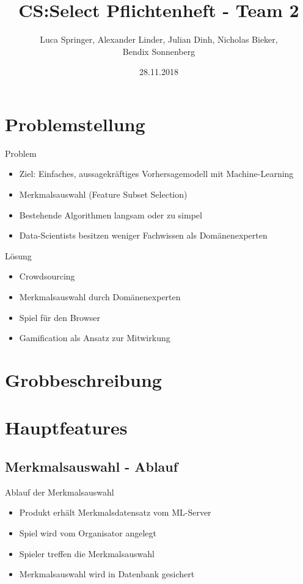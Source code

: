 \documentclass[xcolor=dvipsnames]{beamer}
\title[Team 2 - Pflichtenheft]{CS:Select Pflichtenheft - Team 2}
\author{Luca Springer, Alexander Linder, Julian Dinh, Nicholas Bieker,\\ Bendix Sonnenberg}
\date{28.11.2018}
\begin{document}
\begin{frame} %
  \titlepage
\end{frame}
\section{Problemstellung}
\begin{frame}{Problem}
    \begin{itemize}
        \item Ziel: Einfaches, aussagekräftiges Vorhersagemodell mit Machine-Learning \\
        \item Merkmalsauswahl (Feature Subset Selection) \\
        \item Bestehende Algorithmen langsam oder zu simpel \\
        \item Data-Scientists besitzen weniger Fachwissen als Domänenexperten \\
    \end{itemize}
\end{frame}
\begin{frame}{Lösung}
    \begin{itemize}
        \item Crowdsourcing \\
        \item Merkmalsauswahl durch Domänenexperten \\
        \item Spiel für den Browser \\
        \item Gamification als Ansatz zur Mitwirkung \\
    \end{itemize}
\end{frame}
\section{Grobbeschreibung}
\section{Hauptfeatures}
\subsection{Merkmalsauswahl - Ablauf}
\begin{frame}
    \begin{block}{Ablauf der Merkmalsauswahl}
        \begin{itemize}
            \item Produkt erhält Merkmalsdatensatz vom ML-Server
            \item Spiel wird vom Organisator angelegt
            \item Spieler treffen die Merkmalsauswahl
            \item Merkmalsauswahl wird in Datenbank gesichert
        \end{itemize}
    \end{block}
\end{frame}
\end{document}
